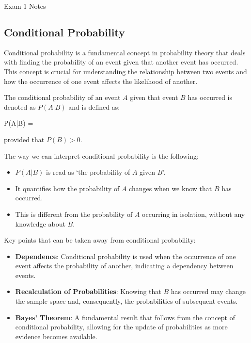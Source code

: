 \begin{examnotes}{Exam 1 Notes}
    \subsection*{Conditional Probability}

    Conditional probability is a fundamental concept in probability theory that deals with finding the probability of an event given that another event has occurred. This concept is crucial for 
    understanding the relationship between two events and how the occurrence of one event affects the likelihood of another.

    The conditional probability of an event $A$ given that event $B$ has occurred is denoted as $P(A|B)$ and is defined as:

    \begin{center}
        \begin{highlightbox}
            P(A|B) = 
        \end{highlightbox}
    \end{center}
    provided that $P(B) > 0$.

    The way we can interpret conditional probability is the following:
    \begin{itemize}
        \item $P(A|B)$ is read as `the probability of $A$ given $B$'.
        \item It quantifies how the probability of $A$ changes when we know that $B$ has occurred.
        \item This is different from the probability of $A$ occurring in isolation, without any knowledge about $B$.
    \end{itemize}
    Key points that can be taken away from conditional probability:
    \begin{itemize}
        \item \textbf{Dependence}: Conditional probability is used when the occurrence of one event affects the probability of another, indicating a dependency between events.
        \item \textbf{Recalculation of Probabilities}: Knowing that $B$ has occurred may change the sample space and, consequently, the probabilities of subsequent events.
        \item \textbf{Bayes' Theorem}: A fundamental result that follows from the concept of conditional probability, allowing for the update of probabilities as more evidence becomes available.
    \end{itemize}


\end{examnotes}
